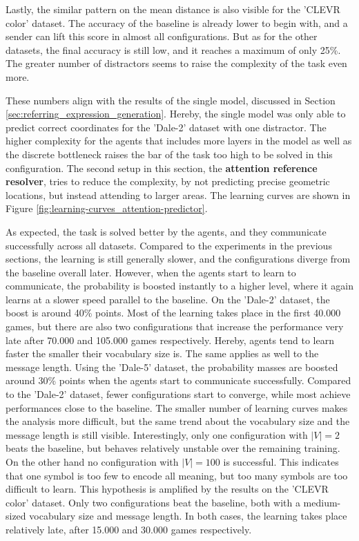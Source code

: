 Lastly, the similar pattern on the mean distance is also visible for the 'CLEVR color' dataset.
The accuracy of the baseline is already lower to begin with, and a sender can lift this score in almost all configurations.
But as for the other datasets, the final accuracy is still low, and it reaches a maximum of only 25\%.
The greater number of distractors seems to raise the complexity of the task even more.

These numbers align with the results of the single model, discussed in Section \ref{sec:referring_expression_generation}.
Hereby, the single model was only able to predict correct coordinates for the 'Dale-2' dataset with one distractor.
The higher complexity for the agents that includes more layers in the model as well as the discrete bottleneck raises the bar of the task too high to be solved in this configuration.
The second setup in this section, the \textbf{attention reference resolver}, tries to reduce the complexity, by not predicting precise geometric locations, but instead attending to larger areas.
The learning curves are shown in Figure \ref{fig:learning-curves_attention-predictor}.

As expected, the task is solved better by the agents, and they communicate successfully across all datasets.
Compared to the experiments in the previous sections, the learning is still generally slower, and the configurations diverge from the baseline overall later.
However, when the agents start to learn to communicate, the probability is boosted instantly to a higher level, where it again learns at a slower speed parallel to the baseline.
On the 'Dale-2' dataset, the boost is around 40\% points.
Most of the learning takes place in the first 40.000 games, but there are also two configurations that increase the performance very late after 70.000 and 105.000 games respectively.
Hereby, agents tend to learn faster the smaller their vocabulary size is.
The same applies as well to the message length.
Using the 'Dale-5' dataset, the probability masses are boosted around 30\% points when the agents start to communicate successfully.
Compared to the 'Dale-2' dataset, fewer configurations start to converge, while most achieve performances close to the baseline.
The smaller number of learning curves makes the analysis more difficult, but the same trend about the vocabulary size and the message length is still visible.
Interestingly, only one configuration with $|V|=2$ beats the baseline, but behaves relatively unstable over the remaining training.
On the other hand no configuration with $|V|=100$ is successful.
This indicates that one symbol is too few to encode all meaning, but too many symbols are too difficult to learn.
This hypothesis is amplified by the results on the 'CLEVR color' dataset.
Only two configurations beat the baseline, both with a medium-sized vocabulary size and message length.
In both cases, the learning takes place relatively late, after 15.000 and 30.000 games respectively.


